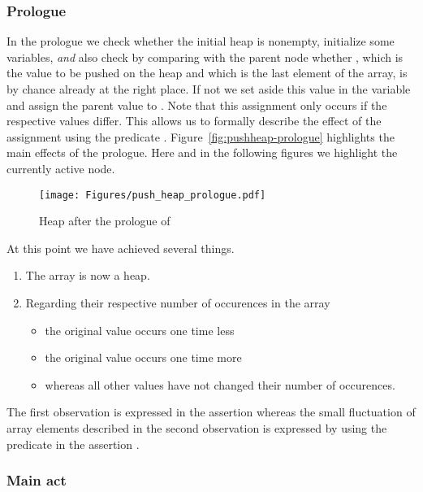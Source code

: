 

\subsubsection{Prologue}

In the prologue we check whether the initial heap is nonempty,
initialize some variables,
\emph{and} also check by comparing with the parent node
whether , which is the value to be pushed on the heap and which
is the last element of the array, is by chance already at the right place.
If not we set aside this value in the variable  and
assign the parent value  to .
Note that this assignment only occurs if the respective values
differ. 
This allows us to formally describe the effect of the assignment using the predicate
.
%
Figure~\ref{fig:pushheap-prologue} highlights the main effects of the prologue.
Here and in the following figures we highlight the currently active node.

\begin{figure}[hbt]
\centering
\texttt{[image: Figures/push\_heap\_prologue.pdf]}
\caption{Heap after the prologue of \pushheap}
\end{figure}

At this point we have achieved several things.
\begin{enumerate}
\item The array  is now a heap.
\item Regarding their respective number of occurences in the array 
\begin{itemize}
\item the original value  occurs one time less
\item the original value  occurs one time more
\item whereas all other values have not changed their number of occurences.
\end{itemize}
\end{enumerate}

The first observation is expressed in the assertion 
whereas the small fluctuation of array elements described in
the second observation is expressed by using the predicate 
in the assertion .


\subsubsection{Main act}

